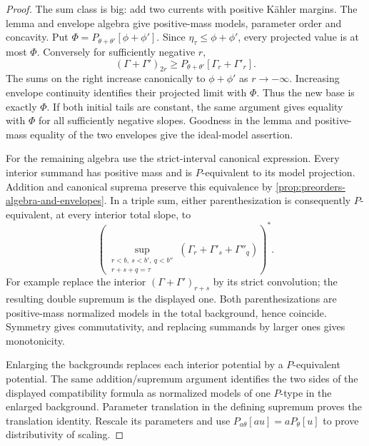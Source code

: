 \begin{proof}
The sum class is big: add two currents with positive K\"ahler margins. The lemma and envelope algebra give positive-mass models, parameter order and concavity. Put $\Phi=P_{\theta+\theta'}[\phi+\phi']$. Since $\eta_\tau\leq\phi+\phi'$, every projected value is at most $\Phi$. Conversely for sufficiently negative $r$,
\[
 (\Gamma+\Gamma')_{2r}
                   \geq P_{\theta+\theta'}[\Gamma_r+\Gamma'_r].
\]
The sums on the right increase canonically to $\phi+\phi'$ as $r\to-\infty$. Increasing envelope continuity identifies their projected limit with $\Phi$. Thus the new base is exactly $\Phi$. If both initial tails are constant, the same argument gives equality with $\Phi$ for all sufficiently negative slopes. Goodness in the lemma and positive-mass equality of the two envelopes give the ideal-model assertion.

For the remaining algebra use the strict-interval canonical expression. Every interior summand has positive mass and is $P$-equivalent to its model projection. Addition and canonical suprema preserve this equivalence by \cref{prop:preorders-algebra-and-envelopes}. In a triple sum, either parenthesization is consequently $P$-equivalent, at every interior total slope, to
\[
 \left(\sup_{\substack{r<b,\ s<b',\ q<b''\\r+s+q=\tau}}
                (\Gamma_r+\Gamma'_s+\Gamma''_q)\right)^*.
\]
For example replace the interior $(\Gamma+\Gamma')_{r+s}$ by its strict convolution; the resulting double supremum is the displayed one. Both parenthesizations are positive-mass normalized models in the total background, hence coincide. Symmetry gives commutativity, and replacing summands by larger ones gives monotonicity.

Enlarging the backgrounds replaces each interior potential by a $P$-equivalent potential. The same addition/supremum argument identifies the two sides of the displayed compatibility formula as normalized models of one $P$-type in the enlarged background. Parameter translation in the defining supremum proves the translation identity. Rescale its parameters and use $P_{a\theta}[au]=aP_\theta[u]$ to prove distributivity of scaling.
\end{proof}

